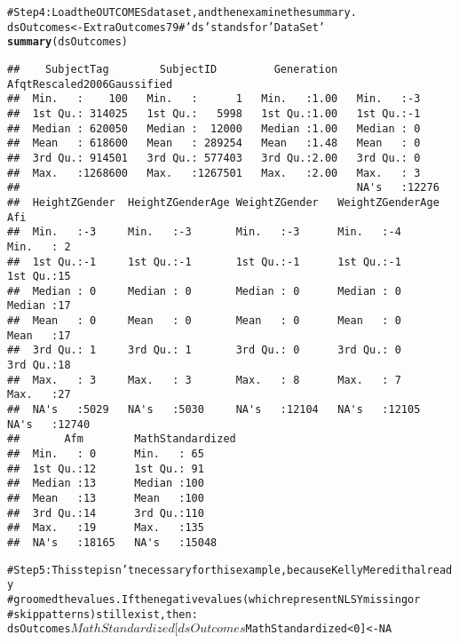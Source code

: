 \documentclass[letterpaper]{article}\usepackage{graphicx, color}
\makeatletter
\newcommand{\hlfunctioncall}[1]{\textcolor[rgb]{0.501960784313725,0,0.329411764705882}{\textbf{#1}}}%
\newcommand{\hlstring}[1]{\textcolor[rgb]{0.6,0.6,1}{#1}}%
\newcommand{\hlcomment}[1]{\textcolor[rgb]{0.180392156862745,0.6,0.341176470588235}{#1}}%
\newenvironment{kframe}{%
 \def\at@end@of@kframe{}%
 \ifinner\ifhmode%
  \def\at@end@of@kframe{\end{minipage}}%
  \begin{minipage}{\columnwidth}%
 \fi\fi%
 \def\FrameCommand##1{\hskip\@totalleftmargin \hskip-\fboxsep
 \colorbox{shadecolor}{##1}\hskip-\fboxsep
     \hskip-\linewidth \hskip-\@totalleftmargin \hskip\columnwidth}%
 \MakeFramed {\advance\hsize-\width
   \@totalleftmargin\z@ \linewidth\hsize
   \@setminipage}}%
 {\par\unskip\endMakeFramed%
 \at@end@of@kframe}
\newenvironment{knitrout}{}{} %
\makeatother
\begin{document}
\begin{knitrout}
\begin{kframe}
\begin{alltt}
\hlcomment{#Step 4: Load the OUTCOMES dataset, and then examine the summary.}
dsOutcomes <- ExtraOutcomes79 \hlcomment{#\hlstring{'ds'} stands for \hlstring{'Data Set'}}
\hlfunctioncall{summary}(dsOutcomes)
\end{alltt}
\begin{verbatim}
##    SubjectTag        SubjectID         Generation   AfqtRescaled2006Gaussified
##  Min.   :    100   Min.   :      1   Min.   :1.00   Min.   :-3                
##  1st Qu.: 314025   1st Qu.:   5998   1st Qu.:1.00   1st Qu.:-1                
##  Median : 620050   Median :  12000   Median :1.00   Median : 0                
##  Mean   : 618600   Mean   : 289254   Mean   :1.48   Mean   : 0                
##  3rd Qu.: 914501   3rd Qu.: 577403   3rd Qu.:2.00   3rd Qu.: 0                
##  Max.   :1268600   Max.   :1267501   Max.   :2.00   Max.   : 3                
##                                                     NA's   :12276             
##  HeightZGender  HeightZGenderAge WeightZGender   WeightZGenderAge      Afi       
##  Min.   :-3     Min.   :-3       Min.   :-3      Min.   :-4       Min.   : 2     
##  1st Qu.:-1     1st Qu.:-1       1st Qu.:-1      1st Qu.:-1       1st Qu.:15     
##  Median : 0     Median : 0       Median : 0      Median : 0       Median :17     
##  Mean   : 0     Mean   : 0       Mean   : 0      Mean   : 0       Mean   :17     
##  3rd Qu.: 1     3rd Qu.: 1       3rd Qu.: 0      3rd Qu.: 0       3rd Qu.:18     
##  Max.   : 3     Max.   : 3       Max.   : 8      Max.   : 7       Max.   :27     
##  NA's   :5029   NA's   :5030     NA's   :12104   NA's   :12105    NA's   :12740  
##       Afm        MathStandardized
##  Min.   : 0      Min.   : 65     
##  1st Qu.:12      1st Qu.: 91     
##  Median :13      Median :100     
##  Mean   :13      Mean   :100     
##  3rd Qu.:14      3rd Qu.:110     
##  Max.   :19      Max.   :135     
##  NA's   :18165   NA's   :15048
\end{verbatim}
\begin{alltt}

\hlcomment{#Step 5: This step isn't necessary for this example, because Kelly Meredith already }
\hlcomment{#   groomed the values.  If the negative values (which represent NLSY missing or }
\hlcomment{#   skip patterns) still exist, then:}
dsOutcomes$MathStandardized[dsOutcomes$MathStandardized < 0] <- NA


\end{alltt}
\end{kframe}
\end{knitrout}
\end{document}
